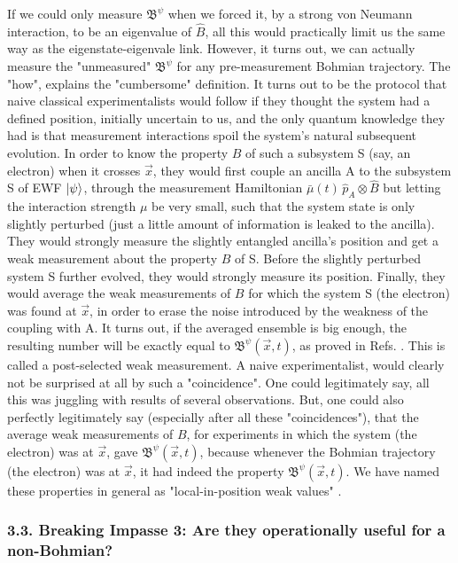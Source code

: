 \documentclass[11pt, a4paper]{article} %
\newcommand{\B}{\mathfrak{B}}
\begin{document}
 If we could only measure $\B^\psi$ when we forced it, by a strong von Neumann interaction, to be an eigenvalue of $\hat{B}$, all this would practically limit us the same way as the eigenstate-eigenvale link. However, it turns out, we can actually measure the "unmeasured" $\B^\psi$ for any pre-measurement Bohmian trajectory. The "how", explains the "cumbersome" definition. It turns out to be the protocol that naive classical experimentalists \cite{WisemanVel} would follow if they thought the system had a defined position, initially uncertain to us, and the only quantum knowledge they had is that measurement interactions spoil the system's natural subsequent evolution. In order to know the property $B$ of such a subsystem S (say, an electron) when it crosses $\vec{x}$, they would first couple an ancilla A to the subsystem S of EWF $\ket{\psi}$, through the measurement Hamiltonian $\bar{\mu}(t)\,\hat{p}_A\otimes\hat{B}$ but letting the interaction strength $\mu$ be very small, such that the system state is only slightly perturbed (just a little amount of information is leaked to the ancilla). They would strongly measure the slightly entangled ancilla's position and get a weak measurement about the property $B$ of S. Before the slightly perturbed system S further evolved, they would strongly measure its position. Finally, they would average the weak measurements of $B$ for which the system S (the electron) was found at $\vec{x}$, in order to erase the noise introduced by the weakness of the coupling with A. It turns out, if the averaged ensemble is big enough, the resulting number will be exactly equal to $\B^\psi(\vec{x},t)$, as proved in Refs. \cite{Weak, DevInPosition1}. This is called a post-selected weak measurement. A naive experimentalist, would clearly not be surprised at all by such a "coincidence". One could legitimately say, all this was juggling with results of several observations. But, one could also perfectly legitimately say (especially after all these "coincidences"), that the average weak measurements of $B$, for experiments in which the system (the electron) was at $\vec{x}$, gave $\B^\psi(\vec{x},t)$, because whenever the Bohmian trajectory (the electron) was at $\vec{x}$, it had indeed the property $\B^\psi(\vec{x},t)$. We have named these properties in general as "local-in-position weak values" \cite{DevInPosition1, DevInPosition2}.\vspace{-0.15cm}


\subsubsection*{3.3. Breaking Impasse 3: Are they operationally useful for a non-Bohmian?}
\vspace{-0.15cm}
\end{document}
